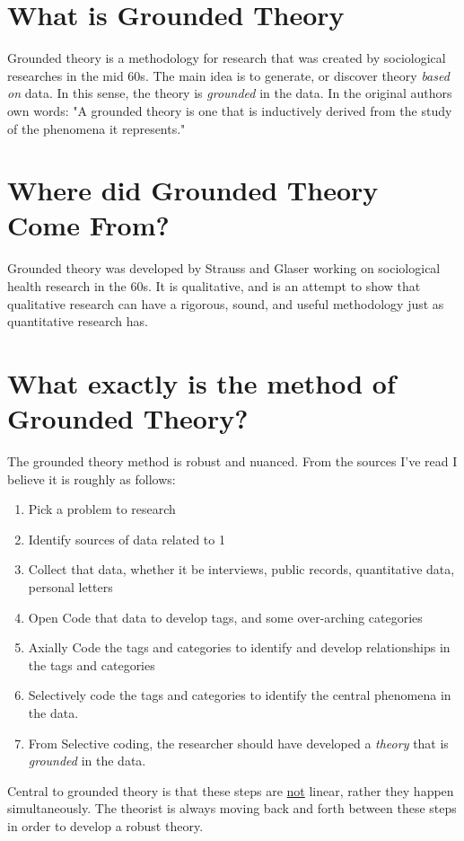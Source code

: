 \documentclass[10pt, letterpaper]{article}
\begin{document}
\section*{What is Grounded Theory}
\label{sec:org372372f}
Grounded theory is a methodology for research that was created by sociological
researches in the mid 60s. The main idea is to generate, or discover theory
\emph{based on} data. In this sense, the theory is \emph{grounded} in the data. In the
original authors own words: "A grounded theory is one that is inductively
derived from the study of the phenomena it represents."\cite{corbin2014basics} 

\section*{Where did Grounded Theory Come From?}
\label{sec:orgf66eba1}
Grounded theory was developed by Strauss and Glaser working on sociological
health research in the 60s. It is qualitative, and is an attempt to show that
qualitative research can have a rigorous, sound, and useful methodology just
as quantitative research has.

\section*{What exactly is the method of Grounded Theory?}
\label{sec:orge80d70c}
The grounded theory method is robust and nuanced. From the sources I've read I
believe it is roughly as follows:
\begin{enumerate}
\item Pick a problem to research
\item Identify sources of data related to 1
\item Collect that data, whether it be interviews, public records, quantitative
data, personal letters
\item Open Code that data to develop tags, and some over-arching categories
\item Axially Code the tags and categories to identify and develop relationships
in the tags and categories
\item Selectively code the tags and categories to identify the central phenomena
in the data.
\item From Selective coding, the researcher should have developed a \emph{theory} that
is \emph{grounded} in the data.
\end{enumerate}

Central to grounded theory is that these steps are \uline{not} linear, rather they
happen simultaneously. The theorist is always moving back and forth between
these steps in order to develop a robust theory.
\end{document}
